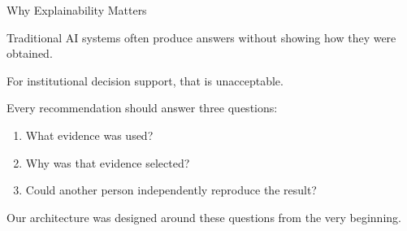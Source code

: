 \documentclass[aspectratio=169]{beamer}
\begin{document}
\begin{frame}{Why Explainability Matters}

Traditional AI systems often produce answers without showing
how they were obtained.

\vspace{0.4cm}

For institutional decision support, that is unacceptable.

\vspace{0.5cm}

Every recommendation should answer three questions:

\begin{enumerate}

\item What evidence was used?

\vspace{0.2cm}

\item Why was that evidence selected?

\vspace{0.2cm}

\item Could another person independently reproduce the result?

\end{enumerate}

\vspace{0.6cm}

Our architecture was designed around these questions from the
very beginning.

\end{frame}
\end{document}
